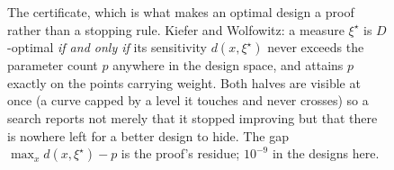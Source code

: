 \documentclass[10pt]{article}
\begin{document}
\begin{figure}[t]
\centering
{}
\caption{The certificate, which is what makes an optimal design a proof rather than a stopping
rule. Kiefer and Wolfowitz: a measure $\xi^\star$ is $D$-optimal \emph{if and only if} its
sensitivity $d(x,\xi^\star)$ never exceeds the parameter count $p$ anywhere in the design
space, and attains $p$ exactly on the points carrying weight. Both halves are visible at once (a curve capped by a level it touches and never crosses) so a search reports not merely
that it stopped improving but that there is nowhere left for a better design to hide. The gap
$\max_x d(x,\xi^\star)-p$ is the proof's residue; $10^{-9}$ in the designs here.}
\label{fig:certificate-schematic}
\end{figure}
\end{document}
